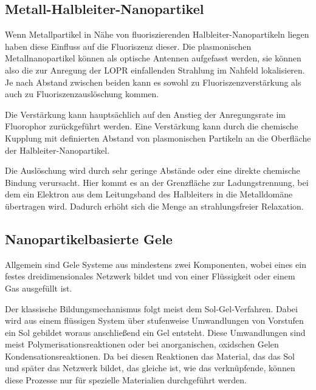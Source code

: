    \subsection{Metall-Halbleiter-Nanopartikel}
    Wenn Metallpartikel in Nähe von fluoriszierenden Halbleiter-Nanopartikeln liegen haben diese Einfluss auf die Fluoriszenz dieser.
    Die plasmonischen Metallnanopartikel können als optische Antennen aufgefasst werden, sie können also die zur Anregung der LOPR einfallenden Strahlung im Nahfeld lokalisieren. 
    Je nach Abstand zwischen beiden kann es sowohl zu Fluoriszenzverstärkung als auch zu Fluoriszenzauslöschung kommen. \autocite{Kulakovic2002,Viste2010}
    
    Die Verstärkung kann hauptsächlich auf den Anstieg der Anregungsrate im Fluorophor zurückgeführt werden.\autocite{Chen2008}
    Eine Verstärkung kann durch die chemische Kupplung mit definierten Abstand von plasmonischen Partikeln an die Oberfläche der Halbleiter-Nanopartikel.\autocite{Lee2004}
    
    Die Auslöschung wird durch sehr geringe Abstände oder eine direkte chemische Bindung verursacht.\autocite{Costi2010}
    Hier kommt es an der Grenzfläche zur Ladungstrennung, bei dem ein Elektron aus dem Leitungsband des Halbleiters in die Metalldomäne übertragen wird.
    Dadurch erhöht sich die Menge an strahlungsfreier Relaxation.
    
    
    \subsection{Nanopartikelbasierte Gele}
    
    Allgemein sind Gele Systeme aus mindestens zwei Komponenten, wobei eines ein festes dreidimensionales Netzwerk bildet und von einer Flüssigkeit oder einem Gas ausgefüllt ist. 
    
    Der klassische Bildungsmechanismus folgt meist dem Sol-Gel-Verfahren. 
    Dabei wird aus einem flüssigen System über stufenweise Umwandlungen von Vorstufen ein Sol gebildet woraus anschließend ein Gel entsteht. 
    Diese Umwandlungen sind meist Polymerisationsreaktionen oder bei anorganischen, oxidschen Gelen Kondensationsreaktionen. 
    Da bei diesen Reaktionen das Material, das das Sol und später das Netzwerk bildet, das gleiche ist, wie das verknüpfende, können diese Prozesse nur für spezielle Materialien durchgeführt werden.
    
